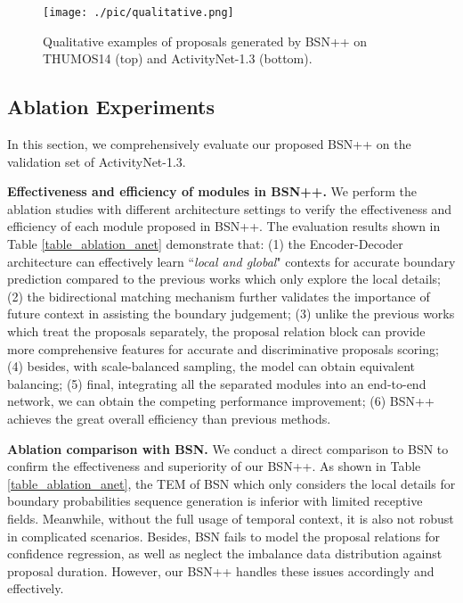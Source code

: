 \documentclass[letterpaper]{article} \usepackage{aaai21}  \usepackage{times}  \usepackage{helvet} \usepackage{courier}  \usepackage[hyphens]{url}  \usepackage{graphicx} \urlstyle{rm} \def\UrlFont{\rm}  \usepackage{natbib}  \usepackage{amsmath,amssymb} \usepackage{caption} \frenchspacing  \usepackage{color}
\begin{document}
\begin{figure}[t]
\begin{center}
		\texttt{[image: ./pic/qualitative.png]}
	\end{center}
	\caption{Qualitative examples of proposals generated by BSN++ on THUMOS14 (top) and ActivityNet-1.3 (bottom).}
	\label{fig:qualitative_examples}
\end{figure}


\subsection{Ablation Experiments}
In this section, we comprehensively evaluate our proposed BSN++ on the validation set of ActivityNet-1.3.

\noindent
\textbf{Effectiveness and efficiency of modules in BSN++.} We perform the ablation studies with different architecture settings to verify the effectiveness and efficiency of each module proposed in BSN++. The evaluation results shown in Table \ref{table_ablation_anet} demonstrate that: (1) the Encoder-Decoder architecture can effectively learn ``\textit{local and global}" contexts for accurate boundary prediction compared to the previous works which only explore the local details; (2) the bidirectional matching mechanism further validates the importance of future context in assisting the boundary judgement; (3) unlike the previous works which treat the proposals separately, the proposal relation block can provide more comprehensive features for accurate and discriminative proposals scoring; (4) besides, with scale-balanced sampling, the model can obtain equivalent balancing; (5) final, integrating all the separated modules into an end-to-end network, we can obtain the competing performance improvement; (6) BSN++ achieves the great overall efficiency than previous methods.

\noindent
\textbf{Ablation comparison with BSN.} We conduct a direct comparison to BSN\cite{BSN} to confirm the effectiveness and superiority of our BSN++. As shown in Table \ref{table_ablation_anet}, the TEM of BSN which only considers the local details for boundary probabilities sequence generation is inferior with limited receptive fields. Meanwhile, without the full usage of temporal context, it is also not robust in complicated scenarios. Besides, BSN fails to model the proposal relations for confidence regression, as well as neglect the imbalance data distribution against proposal duration. However, our BSN++ handles these issues accordingly and effectively.
\end{document}
